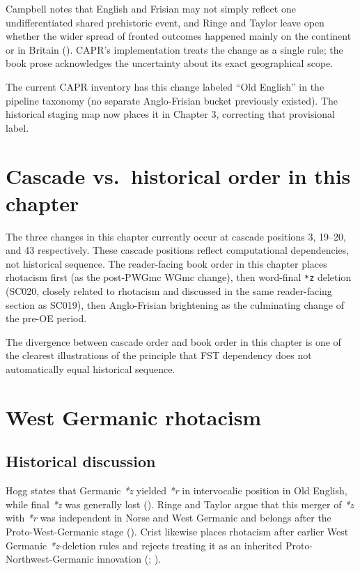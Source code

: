 \documentclass[
  british,
  a4paper,
  openany]{book}
\begin{document}
Campbell notes that English and Frisian may not simply reflect one
undifferentiated shared prehistoric event, and Ringe and Taylor leave
open whether the wider spread of fronted outcomes happened mainly on the
continent or in Britain (). CAPR's implementation treats the change as a single
rule; the book prose acknowledges the uncertainty about its exact
geographical scope.

The current CAPR inventory has this change labeled ``Old English'' in
the pipeline taxonomy (no separate Anglo-Frisian bucket previously
existed). The historical staging map now places it in Chapter 3,
correcting that provisional label.

\section{Cascade vs.~historical order in this
chapter}\label{cascade-vs.-historical-order-in-this-chapter}

The three changes in this chapter currently occur at cascade positions
3, 19--20, and 43 respectively. These cascade positions reflect
computational dependencies, not historical sequence. The reader-facing
book order in this chapter places rhotacism first (as the post-PWGmc
WGmc change), then word-final \texttt{*z} deletion (SC020, closely
related to rhotacism and discussed in the same reader-facing section as
SC019), then Anglo-Frisian brightening as the culminating change of the
pre-OE period.

The divergence between cascade order and book order in this chapter is
one of the clearest illustrations of the principle that FST dependency
does not automatically equal historical sequence.

\section{West Germanic rhotacism}\label{west-germanic-rhotacism}

\subsection{Historical discussion}\label{historical-discussion-23}

Hogg states that Germanic \emph{*z} yielded \emph{*r} in intervocalic
position in Old English, while final \emph{*z} was generally lost
(). Ringe and Taylor argue that
this merger of \emph{*z} with \emph{*r} was independent in Norse and
West Germanic and belongs after the Proto-West-Germanic stage
().
Crist likewise places rhotacism after earlier West Germanic
\emph{*z}-deletion rules and rejects treating it as an inherited
Proto-Northwest-Germanic innovation (; ).
\end{document}
